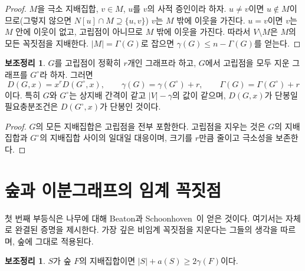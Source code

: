 \documentclass[11pt,a4paper]{article}
\theoremstyle{definition}
\newtheorem{lemma}[theorem]{보조정리}
\begin{document}
\begin{proof}
$M$을 극소 지배집합, $v\in M$, $u$를 $v$의 사적 증인이라 하자. $u\ne v$이면
$u\notin M$이므로(그렇지 않으면 $N[u]\cap M\supseteq\{u,v\}$) $v$는 $M$ 밖에 이웃을
가진다. $u=v$이면 $v$는 $M$ 안에 이웃이 없고, 고립점이 아니므로 $M$ 밖에 이웃을
가진다. 따라서 $V\setminus M$은 $M$의 모든 꼭짓점을 지배한다. $|M|=\Gamma(G)$로
잡으면 $\gamma(G)\le n-\Gamma(G)$를 얻는다.
\end{proof}

\begin{lemma}\label{lem:isolates}
$G$를 고립점이 정확히 $r$개인 그래프라 하고, $G$에서 고립점을 모두 지운 그래프를
$G^{\circ}$라 하자. 그러면
\[
  D(G,x)=x^{r}D(G^{\circ},x),\qquad \gamma(G)=\gamma(G^{\circ})+r,\qquad
  \Gamma(G)=\Gamma(G^{\circ})+r
\]
이다. 특히 $G$와 $G^{\circ}$는 상지배 간격이 같고 $|V|-\gamma$의 값이 같으며,
$D(G,x)$가 단봉일 필요충분조건은 $D(G^{\circ},x)$가 단봉인 것이다.
\end{lemma}

\begin{proof}
$G$의 모든 지배집합은 고립점을 전부 포함한다. 고립점을 지우는 것은 $G$의 지배집합과
$G^{\circ}$의 지배집합 사이의 일대일 대응이며, 크기를 $r$만큼 줄이고 극소성을
보존한다.
\end{proof}

\section{숲과 이분그래프의 임계 꼭짓점}\label{sec:critical}

첫 번째 부등식은 나무에 대해 Beaton과 Schoonhoven~\cite[Lemma~5]{BS}이 얻은 것이다.
여기서는 자체로 완결된 증명을 제시한다. 가장 깊은 비임계 꼭짓점을 지운다는 그들의
생각을 따르며, 숲에 그대로 적용된다.

\begin{lemma}\label{lem:lower}
$S$가 숲 $F$의 지배집합이면 $|S|+a(S)\ge 2\gamma(F)$이다.
\end{lemma}
\end{document}
